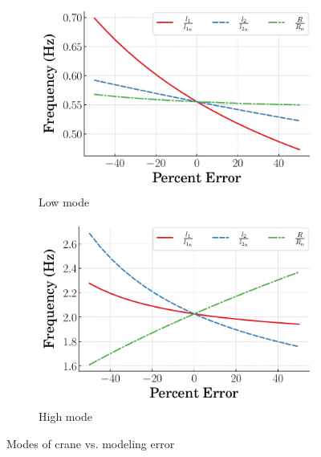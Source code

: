 \begin{figure}[t]
     \centering
     \begin{subfigure}[b]{0.49\textwidth}
         \centering
         \includegraphics[width=\textwidth]{figures/figures_robustness/dpcrane_low_mode.pdf}
         \caption{Low mode}
         \label{subfig_chap4:dpcrane_low_mode}
     \end{subfigure}
     \hfill
     \begin{subfigure}[b]{0.49\textwidth}
         \centering
         \includegraphics[width=\textwidth]{figures/figures_robustness/dpcrane_high_mode.pdf}
         \caption{High mode}
         \label{subfig_chap4:dpcrane_high_mode}
     \end{subfigure}
        \caption{Modes of crane vs. modeling error}
        \label{fig_chap4:dpcrane_modes}
\end{figure}

